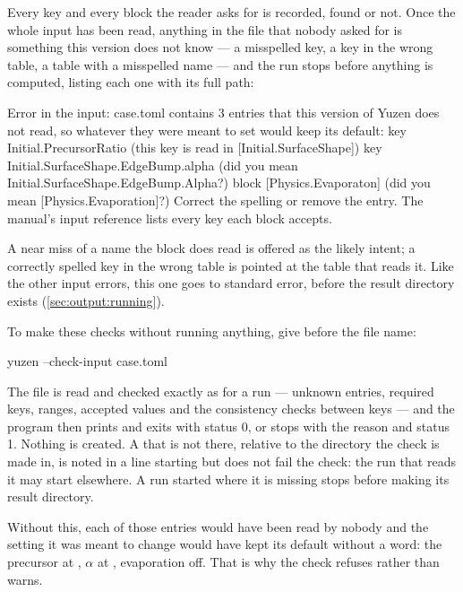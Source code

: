 Every key and every block the reader asks for is recorded, found or not. Once
the whole input has been read, anything in the file that nobody asked for is
something this version does not know --- a misspelled key, a key in the wrong
table, a table with a misspelled name --- and the run stops before anything is
computed, listing each one with its full path:

\begin{plain}
Error in the input: case.toml contains 3 entries that this version of Yuzen
does not read, so whatever they were meant to set would keep its default:
  key   Initial.PrecursorRatio   (this key is read in [Initial.SurfaceShape])
  key   Initial.SurfaceShape.EdgeBump.alpha   (did you mean Initial.SurfaceShape.EdgeBump.Alpha?)
  block [Physics.Evaporaton]   (did you mean [Physics.Evaporation]?)
Correct the spelling or remove the entry. The manual's input reference lists
every key each block accepts.
\end{plain}

A near miss of a name the block does read is offered as the likely intent; a
correctly spelled key in the wrong table is pointed at the table that reads it.
Like the other input errors, this one goes to standard error, before the result
directory exists (\cref{sec:output:running}).

To make these checks without running anything, give 
before the file name:

\begin{shell}
yuzen --check-input case.toml
\end{shell}

The file is read and checked exactly as for a run --- unknown entries,
required keys, ranges, accepted values and the consistency checks between
keys --- and the program then prints  and exits
with status 0, or stops with the reason and status 1. Nothing is created.
A  that is not there, relative to the directory the
check is made in, is noted in a line starting  but does not fail
the check: the run that reads it may start elsewhere. A run started where it
is missing stops before making its result directory.

Without this, each of those entries would have been read by nobody and the
setting it was meant to change would have kept its default without a word:
the precursor at , $\alpha$ at , evaporation off. That is why
the check refuses rather than warns.

